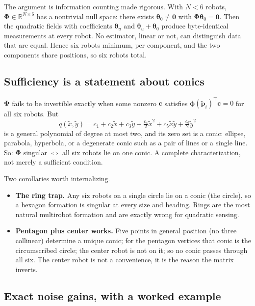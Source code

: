 \documentclass[11pt]{article}
\begin{document}
The argument is information counting made rigorous. With $N < 6$ robots,
$\boldsymbol{\Phi} \in \mathbb{R}^{N\times6}$ has a nontrivial null space:
there exists $\boldsymbol{\theta}_0 \neq \mathbf{0}$ with
$\boldsymbol{\Phi}\boldsymbol{\theta}_0 = \mathbf{0}$. Then the quadratic
fields with coefficients $\boldsymbol{\theta}_u$ and
$\boldsymbol{\theta}_u + \boldsymbol{\theta}_0$ produce byte-identical
measurements at every robot. No estimator, linear or not, can distinguish
data that are equal. Hence six robots minimum, per component, and the two
components share positions, so six robots total.

\subsection{Sufficiency is a statement about conics}

$\boldsymbol{\Phi}$ fails to be invertible exactly when some nonzero
$\mathbf{c}$ satisfies
$\boldsymbol{\phi}(\tilde{\mathbf{p}}_i)^\top\mathbf{c} = 0$ for all six
robots. But
\begin{equation}
q(\tilde{x}, \tilde{y}) = c_1 + c_2\tilde{x} + c_3\tilde{y}
+ \tfrac{c_4}{2}\tilde{x}^2 + c_5\tilde{x}\tilde{y}
+ \tfrac{c_6}{2}\tilde{y}^2
\end{equation}
is a general polynomial of degree at most two, and its zero set is a conic:
ellipse, parabola, hyperbola, or a degenerate conic such as a pair of lines
or a single line. So: $\boldsymbol{\Phi}$ singular $\iff$ all six robots lie
on one conic. A complete characterization, not merely a sufficient
condition.

Two corollaries worth internalizing.
\begin{itemize}
\item \textbf{The ring trap.} Any six robots on a single circle lie on a
conic (the circle), so a hexagon formation is singular at every size and
heading. Rings are the most natural multirobot formation and are exactly
wrong for quadratic sensing.
\item \textbf{Pentagon plus center works.} Five points in general position
(no three collinear) determine a unique conic; for the pentagon vertices
that conic is the circumscribed circle; the center robot is not on it; so no
conic passes through all six. The center robot is not a convenience, it is
the reason the matrix inverts.
\end{itemize}

\subsection{Exact noise gains, with a worked example}
\end{document}
